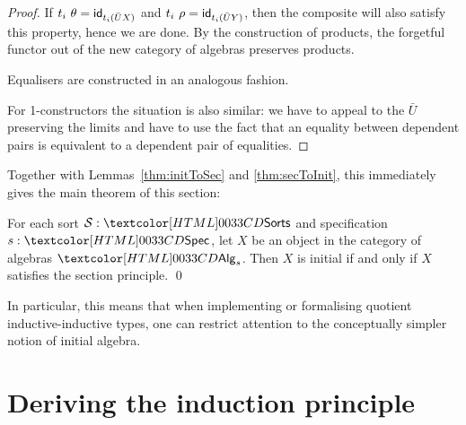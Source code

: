 \begin{proof}
If $t_i\ \theta = \mathsf{id}_{t_i (\bar{U}X)}$ and
$t_i\ \rho = \mathsf{id}_{t_i (\bar{U}Y)}$, then the composite will also
satisfy this property, hence we are done. By the construction of
products, the forgetful functor out of the new category of algebras
preserves products.

Equalisers are constructed in an analogous fashion.

For 1-constructors the situation is also similar: we have to appeal to
the $\bar{U}$ preserving the limits and have to use the fact that an
equality between dependent pairs is equivalent to a dependent pair of
equalities.
\end{proof}

Together with Lemmas~\ref{thm:initToSec} and \ref{thm:secToInit}, this
immediately gives the main theorem of this section:

\begin{theorem}
\label{thm:main}
  For each sort $\Ss : \Sorts$ and specification $s : \Spec$, let $X$
  be an object in the category of algebras $\Alg_s$. Then $X$ is
  initial if and only if $X$ satisfies the section principle. \qed
\end{theorem}

In particular, this means that when implementing or formalising
quotient inductive-inductive types, one can restrict attention to the
conceptually simpler notion of initial algebra.


\section{Deriving the induction principle}
